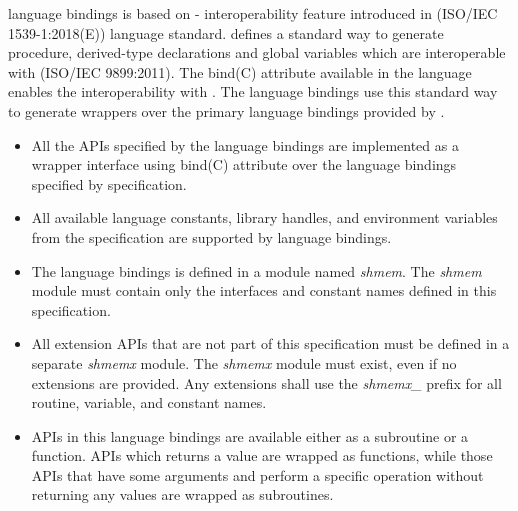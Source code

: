 \openshmem \Fortran[bind(C)] language bindings is based on \Fortran-\Cstd
interoperability feature introduced in \Fortran[2018](ISO/IEC 1539-1:2018(E))
language standard. \Fortran[2018] defines a standard way to generate procedure,
derived-type declarations and global variables which are interoperable with
\Cstd(ISO/IEC 9899:2011). The bind(C) attribute available in the \Fortran
language enables the interoperability with \Cstd. The \openshmem
\Fortran[bind(C)] language bindings use this standard way to generate \Fortran
wrappers over the primary \Cstd language bindings provided by \openshmem.

\begin{itemize}
    \item All the \openshmem APIs specified by the \openshmem \Fortran[bind(C)]
    language bindings are implemented as a wrapper interface using \Fortran
    bind(C) attribute over the \Cstd language bindings specified by \openshmem
    specification.
    \item All available language constants, library handles, and environment
    variables from the \openshmem specification are supported by \openshmem
    \Fortran[bind(C)] language bindings.
    \item The \Fortran[bind(C)] language bindings is defined in a module named
    \textit{shmem}. The \textit{shmem} module must contain only the interfaces
    and constant names defined in this specification.
    \item All \openshmem extension APIs that are not part of this specification
    must be defined in a separate \textit{shmemx} module. The \textit{shmemx}
    module must exist, even if no extensions are provided. Any extensions shall
    use the \textit{shmemx\_} prefix for all routine, variable, and constant
    names.
    \item \openshmem APIs in this language bindings are available either as a
    subroutine or a function. \openshmem \Cstd APIs which returns a value are
    wrapped as functions, while those APIs that have some arguments and perform
    a specific operation without returning any values are wrapped as
    subroutines.
\end{itemize}
